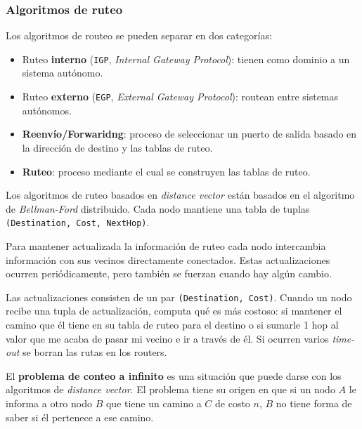 \documentclass[]{article}
\begin{document}
\subsubsection{Algoritmos de ruteo}
Los algoritmos de routeo se pueden separar en dos categorías:
\begin{itemize}
    \item Ruteo \textbf{interno} (\texttt{IGP}, \emph{Internal Gateway Protocol}): tienen como dominio a un sistema autónomo.
    \item Ruteo \textbf{externo} (\texttt{EGP}, \emph{External Gateway Protocol}): routean entre sistemas autónomos.
\end{itemize}


\begin{itemize}
    \item \textbf{Reenvío/Forwaridng}: proceso de seleccionar un puerto de salida basado en la dirección de destino y las tablas de ruteo.
    \item \textbf{Ruteo}: proceso mediante el cual se construyen las tablas de ruteo.
\end{itemize}


Los algoritmos de ruteo basados en \emph{distance vector} están basados en el algoritmo de \emph{Bellman-Ford} distribuido. Cada nodo mantiene una tabla de tuplas \texttt{(Destination, Cost, NextHop)}.

Para mantener actualizada la información de ruteo cada nodo intercambia información con sus vecinos directamente conectados. Estas actualizaciones ocurren periódicamente, pero también se fuerzan cuando hay algún cambio.

Las actualizaciones consisten de un par \texttt{(Destination, Cost)}. Cuando un nodo recibe una tupla de actualización, computa qué es más costoso: si mantener el camino que él tiene en su tabla de ruteo para el destino o si sumarle 1 hop al valor que me acaba de pasar mi vecino e ir a través de él. Si ocurren varios \emph{time-out} se borran las rutas en los routers.

El \textbf{problema de conteo a infinito} es una situación que puede darse con los algoritmos de \emph{distance vector}. El problema tiene su origen en que si un nodo $A$ le informa a otro nodo $B$ que tiene un camino a $C$ de costo $n$, $B$ no tiene forma de saber si él pertenece a ese camino.
\end{document}
